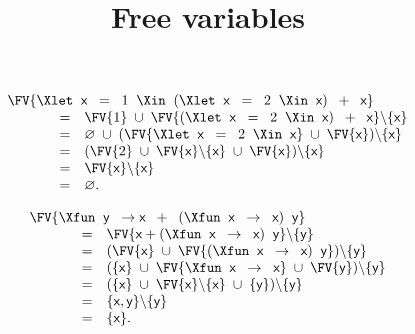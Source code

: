 \documentclass[wide]{slides}
\begin{document}
\begin{slide}
  \title{Free variables}

  \begin{equation*}
    \begin{array}{lcl}
      \multicolumn{3}{l}{
        \FV{\Xlet \;\; \textsf{x} \;\; = \;\; 1 \;\;
          \Xin \;\; (\Xlet \;\; \textsf{x} \;\; = \;\; 2 \;\;
          \Xin \;\; \textsf{x}) \;\; + \;\; \textsf{x}}} \\
      \phantom{XXX} &=& \FV{1} \;\cup\; \FV{(\Xlet \;\; \textsf{x}
        \;\; = \;\; 2 \;\; \Xin \;\; \textsf{x}) \;\; + \;\;
        \textsf{x}} \backslash \{\textsf{x}\}\\
      \phantom{XXX} &=& \varnothing \;\cup\; (\FV{\Xlet \;\;
        \textsf{x} \;\; = \;\; 2 \;\; \Xin \;\;
        \textsf{x}} \;\cup\; \FV{\textsf{x}}) \backslash \{\textsf{x}\}\\
      \phantom{XXX} &=& (\FV{2} \;\cup\; \FV{\textsf{x}} \backslash
      \{\textsf{x}\}  \;\cup\; \FV{\textsf{x}}) \backslash
      \{\textsf{x}\}\\
      \phantom{XXX} &=& \FV{\textsf{x}} \backslash \{\textsf{x}\}\\
      \phantom{XXX} &=& \varnothing.
    \end{array}
  \end{equation*}

  \bigskip

  \begin{equation*}
    \begin{array}{lcl}
      \multicolumn{3}{l}{ \FV{\Xfun \;\; \textsf{y} \;\; \rightarrow
          \textsf{x} \;\; + \;\; (\Xfun \;\; \textsf{x} \;\;
          \rightarrow \;\; \textsf{x}) \;\; \textsf{y}}}\\ \phantom{X}
      &=& \FV{\textsf{x} + (\Xfun \;\; \textsf{x} \;\; \rightarrow
        \;\; \textsf{x}) \;\; \textsf{y}} \backslash
      \{\textsf{y}\}\\ \phantom{X} &=& (\FV{\textsf{x}} \;\cup\;
      \FV{(\Xfun \;\; \textsf{x} \;\; \rightarrow \;\; \textsf{x})
        \;\; \textsf{y}}) \backslash \{\textsf{y}\}\\ \phantom{X} &=&
      (\{\textsf{x}\} \;\cup\; \FV{\Xfun \;\; \textsf{x} \;\;
        \rightarrow \;\; \textsf{x}} \;\cup\; \FV{\textsf{y}})
      \backslash \{\textsf{y}\}\\ \phantom{X} &=& (\{\textsf{x}\}
      \;\cup\; \FV{\textsf{x}} \backslash \{\textsf{x}\} \;\cup\;
      \{\textsf{y}\}) \backslash \{\textsf{y}\}\\ \phantom{XXX} &=&
      \{\textsf{x}, \textsf{y}\} \backslash
      \{\textsf{y}\}\\ \phantom{X} &=& \{\textsf{x}\}.
    \end{array}
  \end{equation*}

\end{slide}
\end{document}
